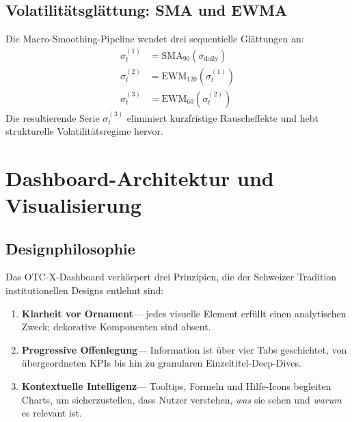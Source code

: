 \documentclass[12pt, a4paper, oneside]{report}
\begin{document}
\section{Volatilit\"atsgl\"attung: SMA und EWMA}

\begin{mathbox}
Die Macro-Smoothing-Pipeline wendet drei sequentielle Gl\"attungen an:
\begin{align}
  \sigma_t^{(1)} &= \text{SMA}_{90}(\sigma_{\text{daily}}) \\
  \sigma_t^{(2)} &= \text{EWM}_{120}\!\left(\sigma_t^{(1)}\right) \\
  \sigma_t^{(3)} &= \text{EWM}_{60}\!\left(\sigma_t^{(2)}\right)
\end{align}
Die resultierende Serie $\sigma_t^{(3)}$ eliminiert kurzfristige Rauscheffekte und hebt strukturelle Volatilit\"atsregime hervor.
\end{mathbox}


\chapter{Dashboard-Architektur und Visualisierung}
\label{ch:dashboard}

\section{Designphilosophie}

Das OTC-X-Dashboard verk\"orpert drei Prinzipien, die der Schweizer Tradition institutionellen Designs entlehnt sind:

\begin{enumerate}[label=\textcolor{swissred}{\textbf{\arabic*.}}]
  \item \textbf{Klarheit vor Ornament}\;--- jedes visuelle Element erf\"ullt einen analytischen Zweck; dekorative Komponenten sind absent.
  \item \textbf{Progressive Offenlegung}\;--- Information ist \"uber vier Tabs geschichtet, von \"ubergeordneten KPIs bis hin zu granularen Einzeltitel-Deep-Dives.
  \item \textbf{Kontextuelle Intelligenz}\;--- Tooltips, Formeln und Hilfe-Icons begleiten Charts, um sicherzustellen, dass Nutzer verstehen, \textit{was} sie sehen und \textit{warum} es relevant ist.
\end{enumerate}
\end{document}
